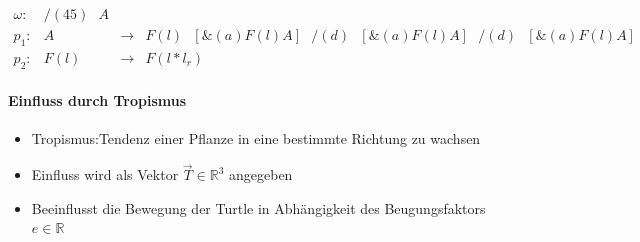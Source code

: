 \begin{equation}
\begin{array}{llll}
\omega :&  /(45)\text{ }A \\
p_1 :&  A &\rightarrow & F(l)\text{ }[\&(a)F(l)A]\text{ }/(d)\text{ }[\&(a)F(l)A]\text{ }/(d)\text{ }[\&(a)F(l)A] \\
p_2 :& F(l) &\rightarrow & F(l*l_r)
\end{array}
\end{equation}




\newpage
{}

\paragraph{Einfluss durch Tropismus\\}


\begin{itemize}
	\item Tropismus:Tendenz einer Pflanze in eine bestimmte Richtung zu wachsen\\
	
	\item Einfluss wird als Vektor $\overrightarrow{T} \in \mathbb{R}^3$ angegeben \\
	
	\item Beeinflusst die Bewegung der Turtle in Abhängigkeit des Beugungsfaktors $e \in \mathbb{R}$
\end{itemize}





